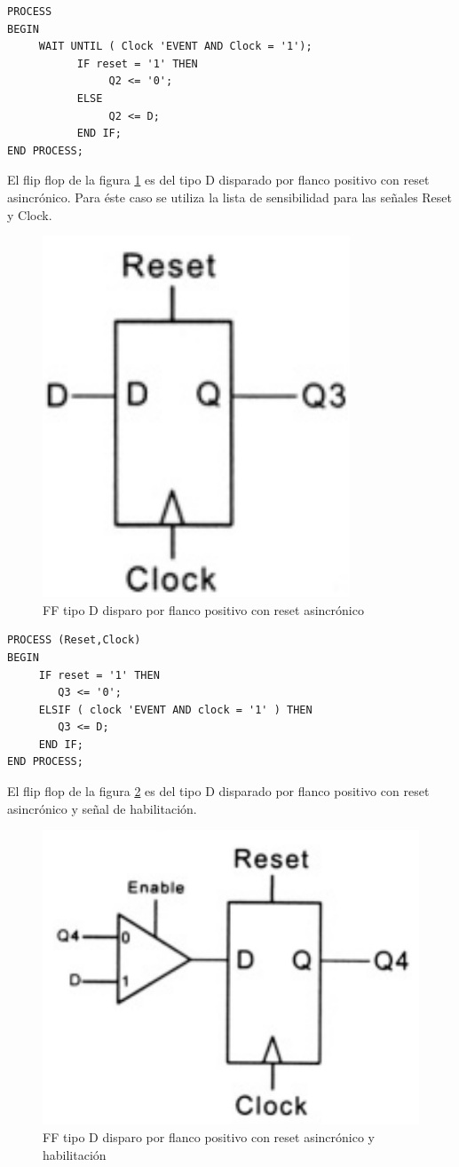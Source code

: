 \begin{lstlisting}[style=vhdl, basicstyle=\footnotesize\ttfamily]
PROCESS
BEGIN
     WAIT UNTIL ( Clock 'EVENT AND Clock = '1');
           IF reset = '1' THEN
                Q2 <= '0';
           ELSE
                Q2 <= D;
           END IF;
END PROCESS;

\end{lstlisting}

El flip flop de la figura \ref{ff3} es del tipo D disparado por flanco positivo
con reset asincrónico. Para éste caso se utiliza la lista de sensibilidad para las
señales Reset y Clock.


\begin{figure}[h]
  \centering
    \includegraphics[width=.3\textwidth]{graficos/ff3.png}
  \caption{FF tipo D disparo por flanco positivo con reset asincrónico}
  \label{ff3}
\end{figure}


\begin{lstlisting}[style=vhdl, basicstyle=\footnotesize\ttfamily]
PROCESS (Reset,Clock)
BEGIN
     IF reset = '1' THEN
        Q3 <= '0';
     ELSIF ( clock 'EVENT AND clock = '1' ) THEN
        Q3 <= D;
     END IF;
END PROCESS;
\end{lstlisting}


El flip flop de la figura \ref{ff4} es del tipo D disparado por flanco positivo
con reset asincrónico y señal de habilitación.

\begin{figure}[h]
  \centering
    \includegraphics[width=.4\textwidth]{graficos/ff4.png}
  \caption{FF tipo D disparo por flanco positivo con reset asincrónico y habilitación}
  \label{ff4}
\end{figure}

